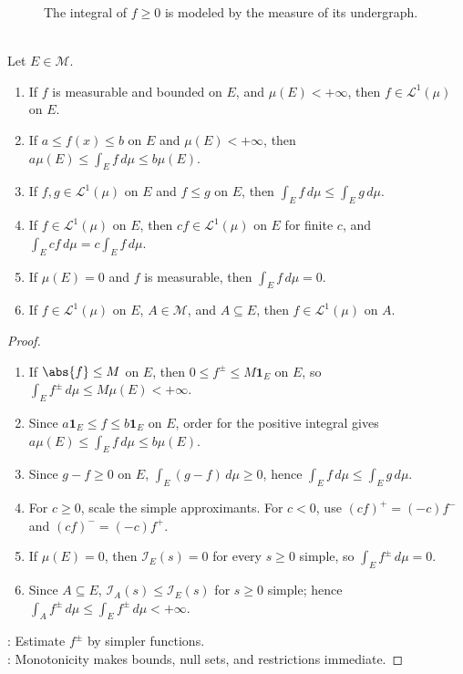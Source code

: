 \begin{figure}[H]
  \centering
  
  \caption{The integral of $f\geq0$ is modeled by the measure of its undergraph.}
  \label{fig:lebesgue-undergraph}
\end{figure}

\begin{proposition} \label{prop:basic-lebesgue-integral-properties} \\
Let $E\in\mathcal{M}$.
\begin{enumerate}[label=(\roman*)]
\setlength{\itemsep}{0pt}
\item If $f$ is measurable and bounded on $E$, and $\mu(E)<+\infty$, then $f\in\mathscr{L}^1(\mu)$ on $E$.
\item If $a\leq f(x)\leq b$ on $E$ and $\mu(E)<+\infty$, then $a\mu(E)\leq\int_E f\,d\mu\leq b\mu(E)$.
\item If $f,g\in\mathscr{L}^1(\mu)$ on $E$ and $f\leq g$ on $E$, then $\int_E f\,d\mu\leq\int_E g\,d\mu$.
\item If $f\in\mathscr{L}^1(\mu)$ on $E$, then $cf\in\mathscr{L}^1(\mu)$ on $E$ for finite $c$, and $\int_E cf\,d\mu=c\int_E f\,d\mu$.
\item If $\mu(E)=0$ and $f$ is measurable, then $\int_E f\,d\mu=0$.
\item If $f\in\mathscr{L}^1(\mu)$ on $E$, $A\in\mathcal{M}$, and $A\subseteq E$, then $f\in\mathscr{L}^1(\mu)$ on $A$.
\end{enumerate}
\begin{proof}
\begin{enumerate}[label=(\roman*)]
\setlength{\itemsep}{0pt}
\item If $\abs{f}\leq M$ on $E$, then $0\leq f^\pm\leq M\mathbf{1}_E$ on $E$, so $\int_Ef^\pm\,d\mu\leq M\mu(E)<+\infty$.
\item Since $a\mathbf{1}_E\leq f\leq b\mathbf{1}_E$ on $E$, order for the positive integral gives $a\mu(E)\leq\int_Ef\,d\mu\leq b\mu(E)$.
\item Since $g-f\geq0$ on $E$, $\int_E(g-f)\,d\mu\geq0$, hence $\int_Ef\,d\mu\leq\int_Eg\,d\mu$.
\item For $c\geq0$, scale the simple approximants. For $c<0$, use $(cf)^+=(-c)f^-$ and $(cf)^-=(-c)f^+$.
\item If $\mu(E)=0$, then $\mathcal{I}_E(s)=0$ for every $s\geq0$ simple, so $\int_Ef^\pm\,d\mu=0$.
\item Since $A\subseteq E$, $\mathcal{I}_A(s)\leq \mathcal{I}_E(s)$ for $s\geq0$ simple; hence $\int_Af^\pm\,d\mu\leq\int_Ef^\pm\,d\mu<+\infty$.
\end{enumerate}
: Estimate $f^\pm$ by simpler functions.\\
: Monotonicity makes bounds, null sets, and restrictions immediate.
\end{proof}
\end{proposition}

